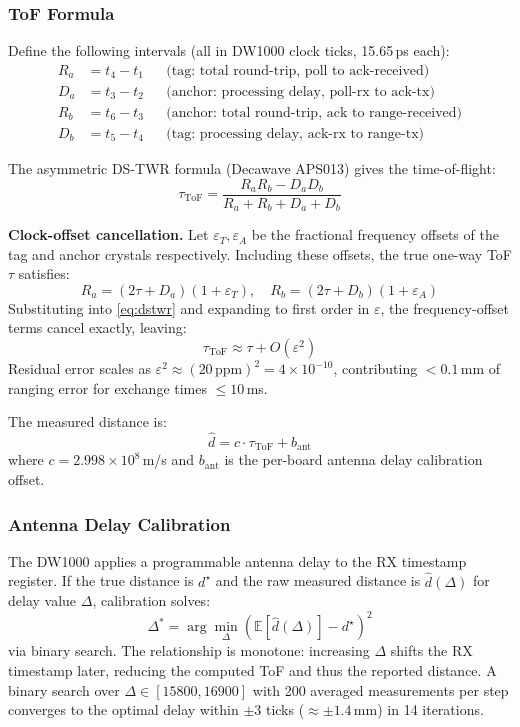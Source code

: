 \documentclass[11pt,a4paper]{article}
\begin{document}
\subsubsection{ToF Formula}

Define the following intervals (all in DW1000 clock ticks, 15.65\,ps each):
\begin{align}
R_a &= t_4 - t_1 & &\text{(tag: total round-trip, poll to ack-received)} \\
D_a &= t_3 - t_2 & &\text{(anchor: processing delay, poll-rx to ack-tx)} \\
R_b &= t_6 - t_3 & &\text{(anchor: total round-trip, ack to range-received)} \\
D_b &= t_5 - t_4 & &\text{(tag: processing delay, ack-rx to range-tx)}
\end{align}

The asymmetric DS-TWR formula (Decawave APS013) gives the time-of-flight:
\begin{equation}
\boxed{
\tau_\text{ToF} = \frac{R_a R_b - D_a D_b}{R_a + R_b + D_a + D_b}
}
\label{eq:dstwr}
\end{equation}

\textbf{Clock-offset cancellation.} Let $\varepsilon_T, \varepsilon_A$ be the fractional frequency offsets of the tag and anchor crystals respectively. Including these offsets, the true one-way ToF $\tau$ satisfies:
\[
R_a = (2\tau + D_a)(1 + \varepsilon_T), \quad R_b = (2\tau + D_b)(1 + \varepsilon_A)
\]
Substituting into \cref{eq:dstwr} and expanding to first order in $\varepsilon$, the frequency-offset terms cancel exactly, leaving:
\[
\tau_\text{ToF} \approx \tau + O(\varepsilon^2)
\]
Residual error scales as $\varepsilon^2 \approx (20\,\text{ppm})^2 = 4 \times 10^{-10}$, contributing $<0.1$\,mm of ranging error for exchange times $\leq 10$\,ms.

The measured distance is:
\begin{equation}
\hat{d} = c \cdot \tau_\text{ToF} + b_\text{ant}
\label{eq:dist}
\end{equation}
where $c = 2.998 \times 10^8$\,m/s and $b_\text{ant}$ is the per-board antenna delay calibration offset.

\subsubsection{Antenna Delay Calibration}

The DW1000 applies a programmable antenna delay to the RX timestamp register. If the true distance is $d^\star$ and the raw measured distance is $\hat{d}(\Delta)$ for delay value $\Delta$, calibration solves:
\[
\Delta^* = \arg\min_\Delta \left(\mathbb{E}\left[\hat{d}(\Delta)\right] - d^\star\right)^2
\]
via binary search. The relationship is monotone: increasing $\Delta$ shifts the RX timestamp later, reducing the computed ToF and thus the reported distance. A binary search over $\Delta \in [15800, 16900]$ with 200 averaged measurements per step converges to the optimal delay within $\pm 3$ ticks ($\approx \pm 1.4$\,mm) in 14 iterations.
\end{document}
